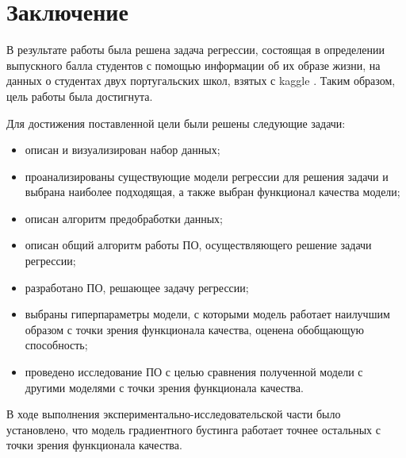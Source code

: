 \chapter*{Заключение}
В результате работы была решена задача регрессии, состоящая в определении выпускного балла студентов с помощью информации об их образе жизни, на данных о студентах двух португальских школ, взятых с kaggle \cite{bib:kaggle}. Таким образом, цель работы была достигнута.

Для достижения поставленной цели были решены следующие задачи:

\begin{itemize}
    \item описан и визуализирован набор данных;
    \item проанализированы существующие модели регрессии для решения задачи и выбрана наиболее подходящая, а также выбран функционал качества модели;
    \item описан алгоритм предобработки данных;
    \item описан общий алгоритм работы ПО, осуществляющего решение задачи регрессии;
    \item разработано ПО, решающее задачу регрессии;
    \item выбраны гиперпараметры модели, с которыми модель работает наилучшим образом с точки зрения функционала качества, оценена обобщающую способность;
    \item проведено исследование ПО с целью сравнения полученной модели с другими моделями с точки зрения функционала качества.
\end{itemize}
В ходе выполнения экспериментально-исследовательской части было установлено, что модель градиентного бустинга работает точнее остальных с точки зрения функционала качества.